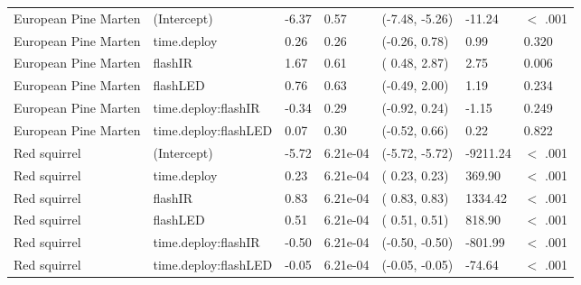 \begin{table}[ht]
\begin{tabular}{lllllll}
  European Pine Marten & (Intercept) & -6.37 & 0.57 & (-7.48, -5.26) & -11.24 & $<$ .001 \\ 
  European Pine Marten & time.deploy & 0.26 & 0.26 & (-0.26,  0.78) & 0.99 & 0.320  \\ 
  European Pine Marten & flashIR & 1.67 & 0.61 & ( 0.48,  2.87) & 2.75 & 0.006  \\ 
  European Pine Marten & flashLED & 0.76 & 0.63 & (-0.49,  2.00) & 1.19 & 0.234  \\ 
  European Pine Marten & time.deploy:flashIR & -0.34 & 0.29 & (-0.92,  0.24) & -1.15 & 0.249  \\ 
  European Pine Marten & time.deploy:flashLED & 0.07 & 0.30 & (-0.52,  0.66) & 0.22 & 0.822  \\ 
  Red squirrel & (Intercept) & -5.72 & 6.21e-04 & (-5.72, -5.72) & -9211.24 & $<$ .001 \\ 
  Red squirrel & time.deploy & 0.23 & 6.21e-04 & ( 0.23,  0.23) & 369.90 & $<$ .001 \\ 
  Red squirrel & flashIR & 0.83 & 6.21e-04 & ( 0.83,  0.83) & 1334.42 & $<$ .001 \\ 
  Red squirrel & flashLED & 0.51 & 6.21e-04 & ( 0.51,  0.51) & 818.90 & $<$ .001 \\ 
  Red squirrel & time.deploy:flashIR & -0.50 & 6.21e-04 & (-0.50, -0.50) & -801.99 & $<$ .001 \\ 
  Red squirrel & time.deploy:flashLED & -0.05 & 6.21e-04 & (-0.05, -0.05) & -74.64 & $<$ .001 \\ 
   \hline
\end{tabular}
\end{table}
